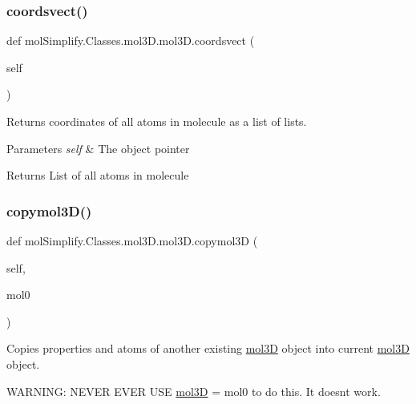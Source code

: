 \subsubsection{\texorpdfstring{coordsvect()}{coordsvect()}}
{\footnotesize\ttfamily def mol\+Simplify.\+Classes.\+mol3\+D.\+mol3\+D.\+coordsvect (\begin{DoxyParamCaption}\item[{}]{self }\end{DoxyParamCaption})}



Returns coordinates of all atoms in molecule as a list of lists. 


\begin{DoxyParams}{Parameters}
{\em self} & The object pointer \\
\hline
\end{DoxyParams}
\begin{DoxyReturn}{Returns}
List of all atoms in molecule 
\end{DoxyReturn}
\mbox{\label{classmolSimplify_1_1Classes_1_1mol3D_1_1mol3D_a09b722d1243e562169a88a591812a2ed}} 
\subsubsection{\texorpdfstring{copymol3\+D()}{copymol3D()}}
{\footnotesize\ttfamily def mol\+Simplify.\+Classes.\+mol3\+D.\+mol3\+D.\+copymol3D (\begin{DoxyParamCaption}\item[{}]{self,  }\item[{}]{mol0 }\end{DoxyParamCaption})}



Copies properties and atoms of another existing \hyperlink{classmolSimplify_1_1Classes_1_1mol3D_1_1mol3D}{mol3D} object into current \hyperlink{classmolSimplify_1_1Classes_1_1mol3D_1_1mol3D}{mol3D} object. 

W\+A\+R\+N\+I\+NG\+: N\+E\+V\+ER E\+V\+ER U\+SE \hyperlink{classmolSimplify_1_1Classes_1_1mol3D_1_1mol3D}{mol3D} = mol0 to do this. It doesn\textquotesingle{}t work.

